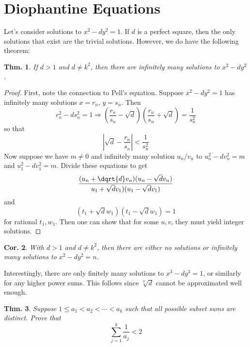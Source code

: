 \documentclass[12pt, a4paper]{book}
\newtheorem{theorem}{Thm.}[section]
\newtheorem{corollary}[theorem]{Cor.}
\theoremstyle{nonumberplain}
\newtheorem{proof}{Proof}
\begin{document}
\section{Diophantine Equations}
Let's consider solutions to $x^2-dy^2=1$.
If $d$ is a perfect square, then the only solutions that exist are the trivial solutions.
However, we do have the following theorem:
\begin{theorem}
    If $d>1$ and $d\neq k^2$, then there are infinitely many solutions to $x^2-dy^2$.
\end{theorem}
\begin{proof}
    First, note the connection to Pell's equation.
    Suppose $x^2-dy^2=1$ has infinitely many solutions $x=r_n$, $y=s_n$.
    Then
    \[r_n^2-ds_n^2=1\Longrightarrow \left(\frac{r_n}{s_n}-\sqrt{d}\right)\left(\frac{r_n}{s_n}+\sqrt{d}\right)=\frac{1}{s_n^2}\]
    so that
    \[\left\lvert\sqrt{d}-\frac{r_n}{s_n}\right\rvert<\frac{1}{s_n^2}\]
    Now suppose we have $m\neq 0$ and infinitely many solution $u_n/v_n$ to $u_n^2-dv_n^2=m$ and $u_1^2-dv_1^2=m$.
    Divide these equations to get
    \[\frac{(u_n+\dqrt{d}v_n)(u_n-\sqrt{d}v_n)}{u_1+\sqrt{d}v_1)(u_1-\sqrt{d}v_1)}\]
    and
    \[(t_1+\sqrt{d}w_1)(t_1-\sqrt{d}w_1)=1\]
    for rational $t_1,w_1$.
    Then one can show that for some $u,v$, they must yield integer solutions.
\end{proof}
\begin{corollary}
    With $d>1$ and $d\neq k^2$, then there are either no solutions or infinitely many solutions to $x^2-dy^2=n$.
\end{corollary}
Interestingly, there are only finitely many solutions to $x^3-dy^3=1$, or similarly for any higher power sums.
This follows since $\sqrt[3]{d}$ cannot be approximated well enough.
\begin{theorem}
    Suppose $1\leq a_1<a_2<\cdots<a_k$ such that all possible subset sums are distinct.
    Prove that
    \[\sum\limits_{j=1}^k\frac{1}{a_j}<2\]
\end{theorem}
\end{document}
